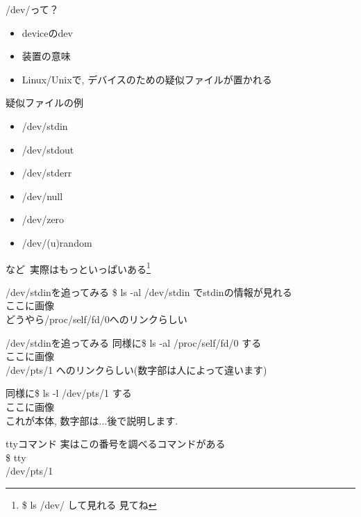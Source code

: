 \documentclass[uplatex, dvipdfmx, unicode]{beamer}
\begin{document}
\begin{frame}{/dev/って？}
  \begin{itemize}
    \item{\alert{dev}iceのdev}
    \item{装置の意味}
    \item{Linux/Unixで, デバイスのための疑似ファイルが置かれる}
  \end{itemize}
\end{frame}

\begin{frame}{疑似ファイルの例}
  \begin{itemize}
    \item{/dev/stdin}
    \item{/dev/stdout}
    \item{/dev/stderr}
    \item{/dev/null}
    \item{/dev/zero}
    \item{/dev/(u)random}
  \end{itemize}
  \vspace{0.2in}
  など\ 実際はもっといっぱいある\footnote{\$ ls /dev/ して見れる 見てね}
\end{frame}

\begin{frame}{/dev/stdinを追ってみる}
  \$ ls -al /dev/stdin でstdinの情報が見れる \\
  \vspace{0.2in}
  ここに画像 \\
  どうやら/proc/self/fd/0へのリンクらしい \\
\end{frame}

\begin{frame}{/dev/stdinを追ってみる}
  同様に\$ ls -al /proc/self/fd/0 する \\
  \vspace{0.2in}
  ここに画像 \\
  /dev/pts/1 へのリンクらしい(数字部は人によって違います)
\end{frame}

\begin{frame}
  同様に\$ ls -l /dev/pts/1 する \\
  ここに画像 \\
  これが本体, 数字部は...後で説明します.
\end{frame}

\begin{frame}{ttyコマンド}
  実はこの番号を調べるコマンドがある \\
  \vspace{0.2in}
  \$ tty \\
  /dev/pts/1
\end{frame}
\end{document}
